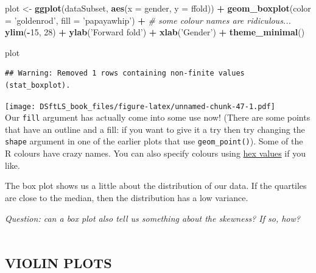 \documentclass[
]{book}
\newenvironment{Shaded}{\begin{snugshade}}{\end{snugshade}}
\newcommand{\CommentTok}[1]{\textcolor[rgb]{0.56,0.35,0.01}{\textit{#1}}}
\newcommand{\DataTypeTok}[1]{\textcolor[rgb]{0.13,0.29,0.53}{#1}}
\newcommand{\DecValTok}[1]{\textcolor[rgb]{0.00,0.00,0.81}{#1}}
\newcommand{\KeywordTok}[1]{\textcolor[rgb]{0.13,0.29,0.53}{\textbf{#1}}}
\newcommand{\NormalTok}[1]{#1}
\newcommand{\OperatorTok}[1]{\textcolor[rgb]{0.81,0.36,0.00}{\textbf{#1}}}
\newcommand{\StringTok}[1]{\textcolor[rgb]{0.31,0.60,0.02}{#1}}
\begin{document}
\begin{Shaded}
\begin{Highlighting}[]
\NormalTok{plot <-}\StringTok{ }\KeywordTok{ggplot}\NormalTok{(dataSubset, }\KeywordTok{aes}\NormalTok{(}\DataTypeTok{x =}\NormalTok{ gender, }\DataTypeTok{y =}\NormalTok{ ffold)) }\OperatorTok{+}
\StringTok{    }\KeywordTok{geom_boxplot}\NormalTok{(}\DataTypeTok{color =} \StringTok{'goldenrod'}\NormalTok{, }\DataTypeTok{fill =} \StringTok{'papayawhip'}\NormalTok{) }\OperatorTok{+}\StringTok{ }
\StringTok{        }\CommentTok{# some colour names are ridiculous...}
\StringTok{    }\KeywordTok{ylim}\NormalTok{(}\OperatorTok{-}\DecValTok{15}\NormalTok{, }\DecValTok{28}\NormalTok{) }\OperatorTok{+}\StringTok{ }\KeywordTok{ylab}\NormalTok{(}\StringTok{'Forward fold'}\NormalTok{) }\OperatorTok{+}\StringTok{ }\KeywordTok{xlab}\NormalTok{(}\StringTok{'Gender'}\NormalTok{) }\OperatorTok{+}
\StringTok{    }\KeywordTok{theme_minimal}\NormalTok{()}

\NormalTok{plot}
\end{Highlighting}
\end{Shaded}

\begin{verbatim}
## Warning: Removed 1 rows containing non-finite values (stat_boxplot).
\end{verbatim}

\texttt{[image: DSftLS\_book\_files/figure-latex/unnamed-chunk-47-1.pdf]}\\

Our \texttt{fill} argument has actually come into some use now! (There are some
points that have an outline and a fill: if you want to give it a try then try
changing the \texttt{shape} argument in one of the earlier plots that use
\texttt{geom\_point()}). Some of the R colours have crazy names. You can also specify
colours using \href{https://www.w3schools.com/colors/colors_picker.asp}{hex values}
if you like.

The box plot shows us a little about the distribution of our data. If the
quartiles are close to the median, then the distribution has a low variance.

\emph{Question: can a box plot also tell us something about the skewness? If so, how?}\\
~\\

\hypertarget{violin-plots}{%
\subsection{VIOLIN PLOTS}\label{violin-plots}}
\end{document}
